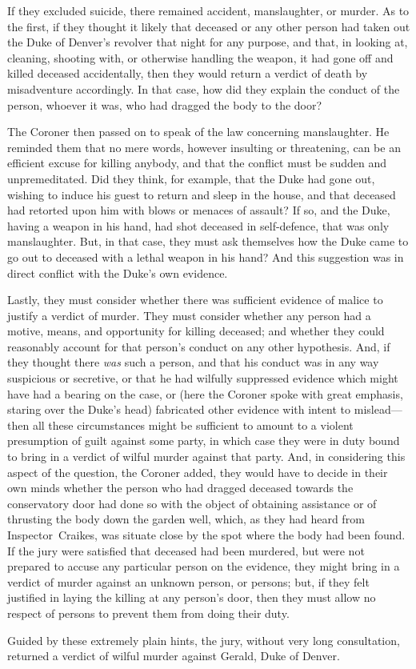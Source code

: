 If they excluded suicide, there remained accident, manslaughter, or murder. As to the first, if they thought it likely that deceased or any other person had taken out the Duke of Denver's revolver that night for any purpose, and that, in looking at, cleaning, shooting with, or otherwise handling the weapon, it had gone off and killed deceased accidentally, then they would return a verdict of death by misadventure accordingly. In that case, how did they explain the conduct of the person, whoever it was, who had dragged the body to the door?

The Coroner then passed on to speak of the law concerning manslaughter.  He reminded them that no mere words, however insulting or threatening, can be an efficient excuse for killing anybody, and that the conflict must be sudden and unpremeditated. Did they think, for example, that the Duke had gone out, wishing to induce his guest to return and sleep in the house, and that deceased had retorted upon him with blows or menaces of assault? If so, and the Duke, having a weapon in his hand, had shot deceased in self-defence, that was only manslaughter. But, in that case, they must ask themselves how the Duke came to go out to deceased with a lethal weapon in his hand? And this suggestion was in direct conflict with the Duke's own evidence.

Lastly, they must consider whether there was sufficient evidence of malice to justify a verdict of murder. They must consider whether any person had a motive, means, and opportunity for killing deceased; and whether they could reasonably account for that person's conduct on any other hypothesis. And, if they thought there \textit{was} such a person, and that his conduct was in any way suspicious or secretive, or that he had wilfully suppressed evidence which might have had a bearing on the case, or (here the Coroner spoke with great emphasis, staring over the Duke's head) fabricated other evidence with intent to mislead—then all these circumstances might be sufficient to amount to a violent presumption of guilt against some party, in which case they were in duty bound to bring in a verdict of wilful murder against that party.  And, in considering this aspect of the question, the Coroner added, they would have to decide in their own minds whether the person who had dragged deceased towards the conservatory door had done so with the object of obtaining assistance or of thrusting the body down the garden well, which, as they had heard from Inspector~Craikes, was situate close by the spot where the body had been found. If the jury were satisfied that deceased had been murdered, but were not prepared to accuse any particular person on the evidence, they might bring in a verdict of murder against an unknown person, or persons; but, if they felt justified in laying the killing at any person's door, then they must allow no respect of persons to prevent them from doing their duty.

Guided by these extremely plain hints, the jury, without very long consultation, returned a verdict of wilful murder against Gerald, Duke of Denver.
